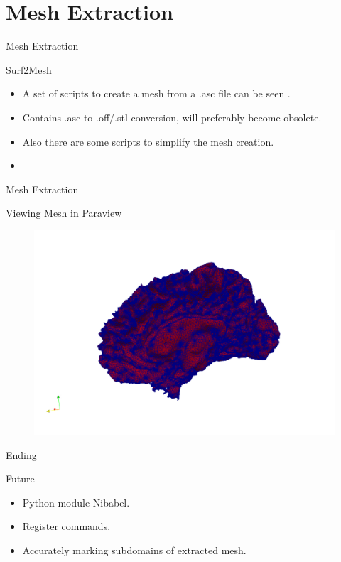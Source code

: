\documentclass{beamer}
\begin{document}
\section{Mesh Extraction}

\begin{frame}{Mesh Extraction}
\begin{block}{Surf2Mesh}
\begin{itemize}
\item<2-> A set of scripts to create a mesh from a .asc file can be seen  \href{https://github.com/larsmva/Surf2Mesh}{}.
\item<3-> Contains .asc to .off/.stl conversion, will preferably become obsolete.
\item<4-> Also there are some scripts to simplify the mesh creation. 
\item<5->  \href{run:./Files/Extmesh_utility.py}{}
\end{itemize}
\end{block}
\end{frame}

\begin{frame}{Mesh Extraction}
\begin{block}{Viewing Mesh in Paraview}
\begin{figure}
\centering
\includegraphics[scale=0.23]{white_mesh.png} 
\end{figure}
\end{block}
\end{frame}



\begin{frame}{Ending}
\begin{block}{Future}
\begin{itemize}
\item<2-> Python module Nibabel.
\item<3-> Register commands. 
\item<4-> Accurately marking subdomains of extracted mesh. 
\end{itemize}
\end{block}
\end{frame}
\end{document}
